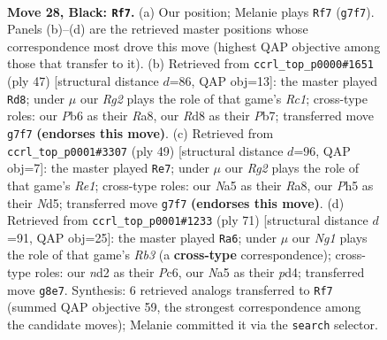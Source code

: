 \documentclass[11pt]{article}
\begin{document}
\clearpage

\begin{figure}[p]\centering
\begin{subfigure}{0.46\textwidth}\centering
\resizebox{\linewidth}{!}{%
\newchessgame
\chessboard[
  setfen={3rbbn1/p1k3r1/1p2p1p1/nP1pP1Pp/P2P1P1K/8/3N4/RNB2B1R b - - 11 28},
  showmover=false,
  pgfstyle=straightmove, color=movearrow, markmove={g7-f7}
]}
\caption{}
\end{subfigure}\hfill
\begin{subfigure}{0.46\textwidth}\centering
\resizebox{\linewidth}{!}{%
\newchessgame
\chessboard[
  setfen={r1r3k1/1p1nbpp1/2p1p1n1/7p/p1PP4/P1N2N1P/1P3PPB/2RR1K2 b - - 4 24},
  showmover=false,
  pgfstyle=straightmove, color=movearrow, markmove={c8-d8}
]}
\caption{}
\end{subfigure}
\\[4pt]
\begin{subfigure}{0.46\textwidth}\centering
\resizebox{\linewidth}{!}{%
\newchessgame
\chessboard[
  setfen={r3r1k1/1p4p1/2p1b2p/3n1p2/p1BPp3/P3P2P/1PRN1PPK/1R6 b - - 5 25},
  showmover=false,
  pgfstyle=straightmove, color=movearrow, markmove={e8-e7}
]}
\caption{}
\end{subfigure}\hfill
\begin{subfigure}{0.46\textwidth}\centering
\resizebox{\linewidth}{!}{%
\newchessgame
\chessboard[
  setfen={1n5r/p3bk2/1rp1p3/1p2Pp2/1P1P2pp/P5P1/N1R1KP1P/2BR4 b - - 2 36},
  showmover=false,
  pgfstyle=straightmove, color=movearrow, markmove={b6-a6}
]}
\caption{}
\end{subfigure}
\caption{\textbf{Move 28, Black: \texttt{Rf7}.} (a) Our position; Melanie plays \texttt{Rf7} (\texttt{g7f7}). Panels (b)--(d) are the retrieved master positions whose correspondence most drove this move (highest QAP objective among those that transfer to it). (b) Retrieved from \texttt{ccrl\_top\_p0000\#1651} (ply 47) [structural distance $d$=86, QAP obj=13]: the master played \texttt{Rd8}; under $\mu$ our \emph{Rg2} plays the role of that game's \emph{Rc1}; cross-type roles: our \emph{P}b6 as their \emph{R}a8, our \emph{R}d8 as their \emph{P}b7; transferred move \texttt{g7f7} \textbf{(endorses this move)}. (c) Retrieved from \texttt{ccrl\_top\_p0001\#3307} (ply 49) [structural distance $d$=96, QAP obj=7]: the master played \texttt{Re7}; under $\mu$ our \emph{Rg2} plays the role of that game's \emph{Re1}; cross-type roles: our \emph{N}a5 as their \emph{R}a8, our \emph{P}h5 as their \emph{N}d5; transferred move \texttt{g7f7} \textbf{(endorses this move)}. (d) Retrieved from \texttt{ccrl\_top\_p0001\#1233} (ply 71) [structural distance $d$=91, QAP obj=25]: the master played \texttt{Ra6}; under $\mu$ our \emph{Ng1} plays the role of that game's \emph{Rb3} (a \textbf{cross-type} correspondence); cross-type roles: our \emph{n}d2 as their \emph{P}c6, our \emph{N}a5 as their \emph{p}d4; transferred move \texttt{g8e7}. Synthesis: 6 retrieved analogs transferred to \texttt{Rf7} (summed QAP objective 59, the strongest correspondence among the candidate moves); Melanie committed it via the \texttt{search} selector.}
\label{fig:thought-m55}
\end{figure}
\end{document}
